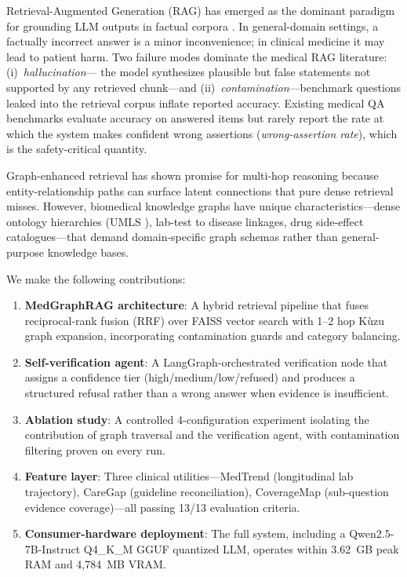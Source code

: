 \documentclass[conference]{IEEEtran}
\begin{document}
Retrieval-Augmented Generation (RAG) has emerged as the dominant paradigm for
grounding LLM outputs in factual corpora \cite{lewis2020retrieval,
izacard2021leveraging}. In general-domain settings, a factually incorrect answer
is a minor inconvenience; in clinical medicine it may lead to patient harm.
Two failure modes dominate the medical RAG literature: (i)~\emph{hallucination}---
the model synthesizes plausible but false statements not supported by any
retrieved chunk---and (ii)~\emph{contamination}---benchmark questions leaked
into the retrieval corpus inflate reported accuracy. Existing medical QA
benchmarks \cite{jin2021disease,chen2024benchmarking} evaluate accuracy on
answered items but rarely report the rate at which the system makes confident
wrong assertions (\emph{wrong-assertion rate}), which is the safety-critical
quantity.

Graph-enhanced retrieval has shown promise for multi-hop reasoning
\cite{edge2024local, xiong2021answering} because entity-relationship paths can
surface latent connections that pure dense retrieval misses. However,
biomedical knowledge graphs have unique characteristics---dense ontology
hierarchies (UMLS \cite{umls2004}), lab-test to disease linkages, drug
side-effect catalogues---that demand domain-specific graph schemas rather than
general-purpose knowledge bases.

We make the following contributions:
\begin{enumerate}
  \item \textbf{MedGraphRAG architecture}: A hybrid retrieval pipeline that
        fuses reciprocal-rank fusion (RRF) \cite{cormack2009rrf} over FAISS
        vector search with 1--2 hop K\`{u}zu graph expansion, incorporating
        contamination guards and category balancing.
  \item \textbf{Self-verification agent}: A LangGraph-orchestrated verification
        node that assigns a confidence tier (high/medium/low/refused) and
        produces a structured refusal rather than a wrong answer when evidence
        is insufficient.
  \item \textbf{Ablation study}: A controlled 4-configuration experiment
        isolating the contribution of graph traversal and the verification
        agent, with contamination filtering proven on every run.
  \item \textbf{Feature layer}: Three clinical utilities---MedTrend
        (longitudinal lab trajectory), CareGap (guideline reconciliation),
        CoverageMap (sub-question evidence coverage)---all passing 13/13
        evaluation criteria.
  \item \textbf{Consumer-hardware deployment}: The full system, including a
        Qwen2.5-7B-Instruct Q4\_K\_M GGUF quantized LLM, operates within
        3.62~GB peak RAM and 4{,}784~MB VRAM.
\end{enumerate}
\end{document}
